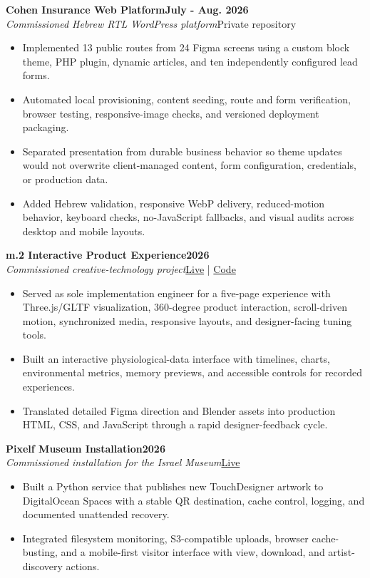 \documentclass[10pt,letterpaper]{article}
\newenvironment{bullets}{\begin{itemize}[topsep=0.03cm,parsep=0pt,partopsep=0pt,itemsep=0.02cm,leftmargin=11pt]}{\end{itemize}}
\newcommand{\project}[4]{\needspace{6\baselineskip}\textbf{#1}\hfill\textbf{#2}\\[-1pt]\textit{#3}\hfill #4\par}
\begin{document}
\project{Cohen Insurance Web Platform}{July - Aug. 2026}{Commissioned Hebrew RTL WordPress platform}{Private repository}
\begin{bullets}
\item Implemented 13 public routes from 24 Figma screens using a custom block theme, PHP plugin, dynamic articles, and ten independently configured lead forms.
\item Automated local provisioning, content seeding, route and form verification, browser testing, responsive-image checks, and versioned deployment packaging.
\item Separated presentation from durable business behavior so theme updates would not overwrite client-managed content, form configuration, credentials, or production data.
\item Added Hebrew validation, responsive WebP delivery, reduced-motion behavior, keyboard checks, no-JavaScript fallbacks, and visual audits across desktop and mobile layouts.
\end{bullets}

\project{m.2 Interactive Product Experience}{2026}{Commissioned creative-technology project}{\href{https://isadeh.com/m2-experience/}{Live} \;|\; \href{https://github.com/IddoSadeh/m2-experience}{Code}}
\begin{bullets}
\item Served as sole implementation engineer for a five-page experience with Three.js/GLTF visualization, 360-degree product interaction, scroll-driven motion, synchronized media, responsive layouts, and designer-facing tuning tools.
\item Built an interactive physiological-data interface with timelines, charts, environmental metrics, memory previews, and accessible controls for recorded experiences.
\item Translated detailed Figma direction and Blender assets into production HTML, CSS, and JavaScript through a rapid designer-feedback cycle.
\end{bullets}

\project{Pixelf Museum Installation}{2026}{Commissioned installation for the Israel Museum}{\href{https://pixelf.fra1.digitaloceanspaces.com/index.html}{Live}}
\begin{bullets}
\item Built a Python service that publishes new TouchDesigner artwork to DigitalOcean Spaces with a stable QR destination, cache control, logging, and documented unattended recovery.
\item Integrated filesystem monitoring, S3-compatible uploads, browser cache-busting, and a mobile-first visitor interface with view, download, and artist-discovery actions.
\end{bullets}
\end{document}
